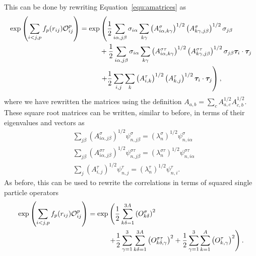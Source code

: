 This can be done by rewriting Equation~\ref{equ:amatrices} as
\begin{equation}
\begin{split}
   \exp\left(\sum\limits_{i<j,p}f_p(r_{ij})\mathcal{O}^p_{ij}\right) = \exp&\left(\frac{1}{2}\sum\limits_{i\alpha,j\beta} \sigma_{i\alpha}\sum\limits_{k\gamma}\left(A^{\sigma}_{i\alpha,k\gamma}\right)^{1/2}\left(A^{\sigma}_{k\gamma,j\beta}\right)^{1/2}\sigma_{j\beta}\right. \\
      & + \frac{1}{2}\sum\limits_{i\alpha,j\beta} \sigma_{i\alpha}\sum\limits_{k\gamma}\left(A^{\sigma\tau}_{i\alpha,k\gamma}\right)^{1/2}\left(A^{\sigma\tau}_{k\gamma,j\beta}\right)^{1/2}\sigma_{j\beta}\bm{\tau}_i\cdot\bm{\tau}_j \\
      &\left. + \frac{1}{2}\sum\limits_{i,j} \sum\limits_{k}\left(A^{\tau}_{i,k}\right)^{1/2}\left(A^{\tau}_{k,j}\right)^{1/2}\bm{\tau}_i\cdot\bm{\tau}_j\right),
\end{split}
\end{equation}
where we have rewritten the matrices using the definition $A_{a,b} = \sum_cA^{1/2}_{a,c}A^{1/2}_{c,b}$. These square root matrices can be written, similar to before, in terms of their eigenvalues and vectors as
\begin{align}
   &\sum\limits_{j\beta} \left(A^{\sigma}_{i\alpha,j\beta}\right)^{1/2}\psi^{\sigma}_{n,j\beta} = \left(\lambda^{\sigma}_n\right)^{1/2}\psi^{\sigma}_{n,i\alpha} \\
   &\sum\limits_{j\beta} \left(A^{\sigma\tau}_{i\alpha,j\beta}\right)^{1/2}\psi^{\sigma\tau}_{n,j\beta} = \left(\lambda^{\sigma\tau}_n\right)^{1/2}\psi^{\sigma\tau}_{n,i\alpha} \\
   &\sum\limits_{j} \left(A^{\tau}_{i,j}\right)^{1/2}\psi^{\tau}_{n,j} = \left(\lambda^{\tau}_n\right)^{1/2}\psi^{\tau}_{n,i}.
\end{align}
As before, this can be used to rewrite the correlations in terms of squared single particle operators
\begin{equation}
\begin{split}
   \exp\left(\sum\limits_{i<j,p}f_p(r_{ij})\mathcal{O}^p_{ij}\right) = \exp&\left(\frac{1}{2}\sum\limits_{k\delta=1}^{3A} \left(O_{k\delta}^{\sigma}\right)^2\right. \\
      & \left. + \frac{1}{2}\sum\limits_{\gamma=1}^{3}\sum\limits_{k\delta=1}^{3A} \left(O_{k\delta,\gamma}^{\sigma\tau}\right)^2
      + \frac{1}{2}\sum\limits_{\gamma=1}^{3}\sum\limits_{k=1}^{A} \left(O_{k,\gamma}^{\tau}\right)^2\right).
\end{split}
\end{equation}
